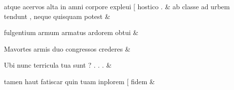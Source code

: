\documentclass[12pt,onecolumn,twoside,a4paper]{memoir}
\begin{document}
\begin{pairs}
\begin{Leftside}
                              atque
                              acervos
                              alta
                              in
                              amni
                              corpore
                              expleui
                              [
                              hostico
                              . \&
                         \stanza {}ab
                              classe
                              ad
                              urbem
                              tendunt
                              ,
                              neque
                              quisquam
                              potest & 
                     
                              fulgentium
                              armum
                              armatus
                              ardorem
                              obtui \&
                         \stanza {}
                     
                              Mavortes
                              armis
                              duo
                              congressos
                              crederes \&
                         \stanza {}
                     
                              Ubi
                              nunc
                              terricula
                              tua
                              sunt
                              ?
                              .
                              .
                              . \&
                         \stanza {}
                     
                              tamen
                              haut
                              fatiscar
                              quin
                              tuam
                              inplorem
                              [
                              fidem \&
                         \stanza {}
                     

\end{Leftside}
\end{pairs}
\end{document}
